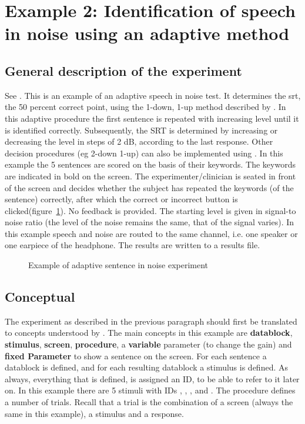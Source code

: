 \newpage
\section{Example 2: Identification of speech in noise using an adaptive method}

\subsection{General description of the experiment}
See . This is an
example of an adaptive speech in noise test. It determines the
 \ac{srt}, the 50 percent correct point, using
the 1-down, 1-up method described by \citet{PM79}. In this
adaptive procedure the first sentence is repeated with increasing
level until it is identified correctly. Subsequently, the SRT is
determined by increasing or decreasing the level in steps of 2 dB,
according to the last response. Other decision procedures (eg
2-down 1-up) can also be implemented using \apex. In this example
the 5 sentences are scored on the basis of their keywords. The
keywords are indicated in bold on the screen. The
experimenter/clinician is seated in front of the screen and
decides whether the subject has repeated the keywords (of the
sentence) correctly, after which the correct or incorrect button
is clicked(figure~\ref{fig:sentencenoise}). No feedback is
provided. The starting level is given in signal-to noise ratio
(the level of the noise remains the same, that of the signal
varies). In this example speech and noise are routed to the same
channel, i.e. one speaker or one earpiece of the headphone. The
results are written to a results file.

\begin{figure}
 \centering
 \caption{Example of adaptive sentence in noise experiment}
 \label{fig:sentencenoise}

\end{figure}
\subsection{Conceptual}
The experiment as described in the previous paragraph should first
be translated to concepts understood by \apex. The main concepts
in this example are \textbf{datablock}, \textbf{stimulus},
\textbf{screen}, \textbf{procedure}, a \textbf{variable} parameter
(to change the gain) and \textbf{fixed Parameter} to show a
sentence on the screen. For each sentence a datablock is defined,
and for each resulting datablock a stimulus is defined. As always,
everything that is defined, is assigned an ID, to be able to refer
to it later on. In this example there are 5 stimuli with IDs
, ,
,  and
. The procedure defines a number of trials.
Recall that a trial is the combination of a screen (always the
same in this example), a stimulus and a response.

